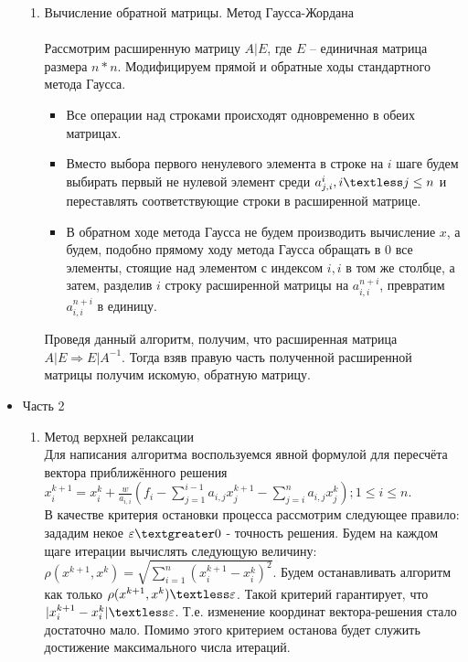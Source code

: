 \documentclass[a4paper,12pt,titlepage,finall]{article}
\newcommand{\gt}{\textgreater} %
\newcommand{\lt}{\textless}       %
\begin{document}
\begin{itemize}
\begin{enumerate}
\item	Вычисление обратной матрицы. Метод Гаусса-Жордана\\
~\\
Рассмотрим расширенную матрицу $A|E$, где $E$ – единичная матрица размера $n*n$. Модифицируем прямой и обратные ходы стандартного метода Гаусса.
\begin{itemize}
\item	Все операции над строками происходят одновременно в обеих матрицах.
\item	Вместо выбора первого ненулевого элемента в строке на $i$ шаге будем выбирать первый не нулевой элемент среди $a_{j,i}^{i},i \lt j \leq n$ и переставлять соответствующие строки в расширенной матрице.
\item	В обратном ходе метода Гаусса не будем производить вычисление ${x}$, а будем, подобно прямому ходу метода Гаусса обращать в $0$ все элементы, стоящие над элементом с индексом $i,i$ в том же столбце, а затем, разделив $i$ строку расширенной матрицы на $a_{i,i}^{n+i}$, превратим $a_{i,i}^{n+i}$ в единицу.
\end{itemize}
Проведя данный алгоритм, получим, что расширенная матрица $A|E\Rightarrow{}E|A^{-1}$. Тогда взяв правую часть полученной расширенной матрицы получим искомую, обратную матрицу.

\end{enumerate}

\item Часть 2

\begin{enumerate}

\item Метод верхней релаксации\\
Для написания алгоритма воспользуемся явной формулой для пересчёта вектора приближённого решения $x^{k+1}_{i} = x^{k}_{i} + \frac{w}{a_{i,i}}(f_{i} - \sum\limits_{j=1}^{i-1} a_{i,j}x^{k+1}_{j} - \sum\limits_{j=i}^{n} a_{i,j}x^{k}_{j}) ; 1 \leq i \leq n$. \\
В качестве критерия остановки процесса рассмотрим следующее правило: зададим некое $\varepsilon \gt 0$ - точность решения. Будем на каждом щаге итерации вычислять следующую величину:  $\rho({x}^{k + 1}, {x}^{k}) = \sqrt{\sum\limits_{i=1}^{n} ({x}^{k+1}_{i} - {x}^{k}_{i})^2}$. Будем останавливать алгоритм как только $\rho({x}^{k + 1},{x}^{k}) \lt \varepsilon$. Такой критерий гарантирует, что $|{x}^{k+1}_{i} - {x}^{k}_{i}| \lt \varepsilon$. Т.е. изменение координат вектора-решения стало достаточно мало. Помимо этого критерием останова будет служить достижение максимального числа итераций.
\end{enumerate}
\end{itemize}
\newpage
\end{document}
